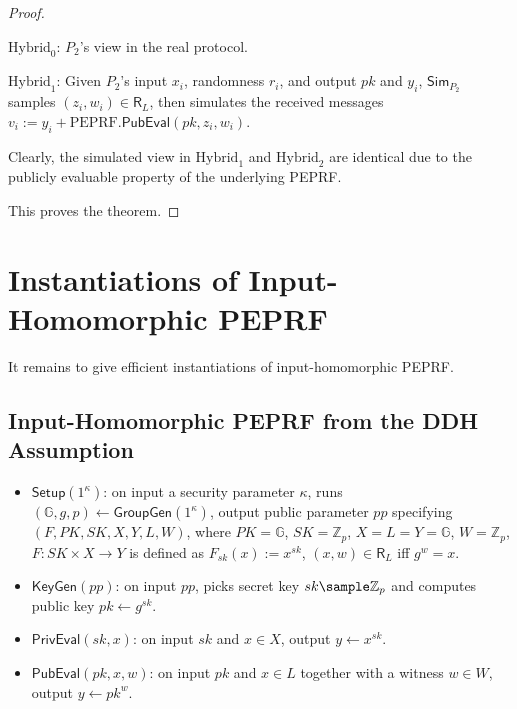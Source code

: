 \documentclass[a4paper,10pt]{article}
\begin{document}
\begin{proof}
\begin{trivlist}
\item $\text{Hybrid}_0$: $P_2$'s view in the real protocol.

\item $\text{Hybrid}_1$: Given $P_2$'s input $x_i$, randomness $r_i$, 
    and output $pk$ and $y_i$, 
    $\mathsf{Sim}_{P_2}$ samples $(z_i, w_i) \in \mathsf{R}_L$, 
    then simulates the received messages $v_i:= y_i + \text{PEPRF}.\mathsf{PubEval}(pk, z_i, w_i)$. 

Clearly, the simulated view in $\text{Hybrid}_1$ and $\text{Hybrid}_2$ are identical 
due to the publicly evaluable property of the underlying PEPRF. 
\end{trivlist}
This proves the theorem. 
\end{proof}

\section{Instantiations of Input-Homomorphic PEPRF}
It remains to give efficient instantiations of input-homomorphic PEPRF.

\subsection{Input-Homomorphic PEPRF from the DDH Assumption}\label{subsec:IHPEPRF-from-DDH}
\begin{itemize}
\item $\mathsf{Setup}(1^\kappa)$: on input a security parameter $\kappa$, 
    runs $(\mathbb{G}, g, p) \leftarrow \mathsf{GroupGen}(1^\kappa)$, 
    output public parameter $pp$ specifying $(F, PK, SK, X, \allowbreak Y, L, W)$, 
    where $PK = \mathbb{G}$, $SK = \mathbb{Z}_p$, $X = L = Y = \mathbb{G}$, $W = \mathbb{Z}_p$, 
    $F: SK \times X \rightarrow Y$ is defined as $F_{sk}(x):=x^{sk}$, 
    $(x, w) \in \mathsf{R}_L$ iff $g^w = x$.   

\item $\mathsf{KeyGen}(pp)$: on input $pp$, picks secret key $sk \sample \mathbb{Z}_p$ 
        and computes public key $pk \leftarrow g^{sk}$. 
    
\item $\mathsf{PrivEval}(sk, x)$: on input $sk$ and $x \in X$, output $y \leftarrow x^{sk}$.  

\item $\mathsf{PubEval}(pk, x, w)$: on input $pk$ and $x \in L$ together with a witness $w \in W$, 
        output $y \leftarrow pk^w$.  
\end{itemize}
\end{document}
